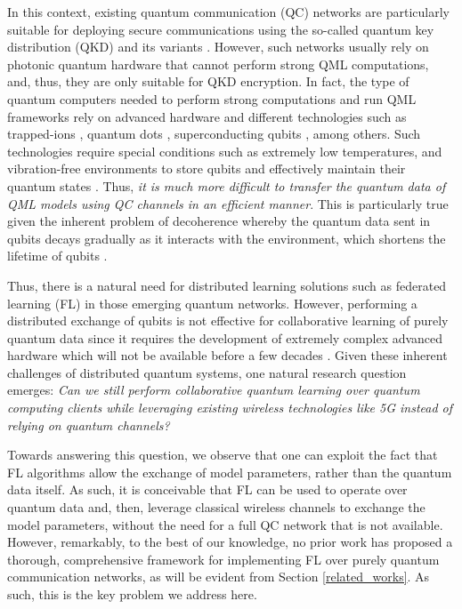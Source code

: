 \documentclass{article}
\begin{document}
In this context, existing quantum communication (QC) networks are particularly suitable for deploying secure communications using the so-called quantum key distribution (QKD) and its variants \cite{qkd}. However, such networks usually rely on photonic quantum hardware that cannot perform strong QML computations, and, thus, they are only suitable for QKD encryption. In fact, the type of quantum computers needed to perform strong computations and run QML frameworks rely on advanced hardware and different technologies such as trapped-ions \cite{trapped_ions1}, quantum dots \cite{quantum_dots1}, superconducting qubits \cite{devoret2004superconducting}, among others. Such technologies require special conditions such as extremely low temperatures, and vibration-free environments to store qubits and effectively maintain their quantum states \cite{nielsen_book}. Thus, \emph{it is much more difficult to transfer the quantum data of QML models using QC channels in an efficient manner}. This is particularly true given the inherent problem of decoherence whereby the quantum data sent in qubits decays gradually as it interacts with the environment, which shortens the lifetime of qubits \cite{nielsen_book}.



Thus, there is a natural need for distributed learning solutions such as federated learning (FL) \cite{kairouz2019advances_FL} in those emerging quantum networks. However, performing a distributed exchange of qubits is not effective for collaborative learning of purely quantum data since it requires the development of extremely complex advanced hardware which will not be available before a few decades \cite{decades}. Given these inherent challenges of distributed quantum systems, one natural research question emerges: \emph{Can we still perform collaborative quantum learning over quantum computing clients while leveraging existing wireless technologies like 5G instead of relying on quantum channels?} 


Towards answering this question, we observe that one can exploit the fact that FL algorithms allow the exchange of model parameters, rather than the quantum data itself. As such, it is conceivable that FL can be used to operate over quantum data and, then, leverage classical wireless channels to exchange the model parameters, without the need for a full QC network that is not available. However, remarkably, to the best of our knowledge, no prior work has proposed a thorough, comprehensive framework for implementing FL over purely quantum communication networks, as will be evident from Section \ref{related_works}. As such, this is the key problem we address here.
\end{document}
